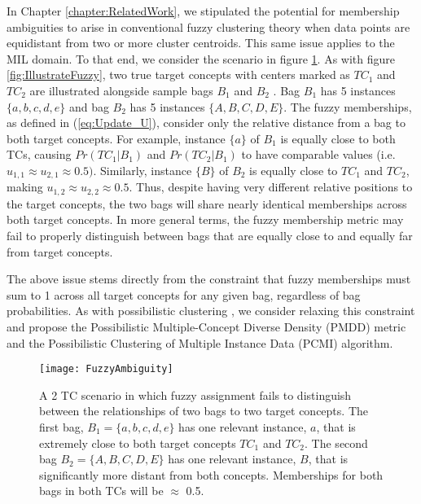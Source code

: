 \documentclass[12pt,dvips]{report}
\numberwithin{equation}{section}
\begin{document}
In Chapter \ref{chapter:RelatedWork}, we stipulated the potential for membership ambiguities to arise in conventional fuzzy clustering theory when data points are equidistant from two or more cluster centroids.  This same issue applies to the MIL domain.  To that end, we consider the scenario in figure \ref{fig:IllustratePoss}.  As with  figure \ref{fig:IllustrateFuzzy}, two true target concepts with centers marked as $TC_1$ and $TC_2$ are illustrated alongside sample bags $B_1$ and $B_2$ . Bag $B_1$ has 5 instances $\{a,b,c,d,e\}$ and bag $B_2$ has 5 instances $\{A,B,C,D,E\}$.  The fuzzy memberships, as defined in (\ref{eq:Update_U}), consider only the relative distance from a bag to both target concepts.  For example, instance $\{a\}$ of $B_1$ is equally close to both TCs, causing $Pr(TC_1\vert B_1)$ and $Pr(TC_2\vert B_1)$ to have comparable values (i.e. $u_{1,1} \approx u_{2,1} \approx 0.5)$.  Similarly, instance $\{B\}$ of $B_2$ is equally close to $TC_1$ and $TC_2$, making $u_{1,2} \approx u_{2,2} \approx 0.5$.  Thus, despite having very different relative positions to the target concepts, the two bags will share nearly identical memberships across both target concepts.  In more general terms, the fuzzy membership metric may fail to properly distinguish between bags that are equally close to and equally far from target concepts.

The above issue stems directly from the constraint that fuzzy memberships must sum to 1 across all target concepts for any given bag, regardless of bag probabilities.  As with possibilistic clustering \cite{PCM}, we consider relaxing this constraint and propose the Possibilistic Multiple-Concept Diverse Density (PMDD) metric and the Possibilistic Clustering of Multiple Instance Data (PCMI) algorithm.

\begin{figure}[htb] 
  \centering
  \centerline{\texttt{[image: FuzzyAmbiguity]}}
  \caption{A 2 TC scenario in which fuzzy assignment fails to distinguish between the relationships of two bags to two target concepts. The first bag, $B_1=\{a, b, c, d, e \}$ has one relevant instance, $a$, that is extremely close to both target concepts $TC_1$ and $TC_2$. The second bag $B_2=\{A, B, C, D, E\}$ has one relevant instance, $B$, that is significantly more distant from both concepts.  Memberships for both bags in both TCs will be $\approx$ 0.5.}
  \label{fig:IllustratePoss}
\end{figure}
   

\end{document}

